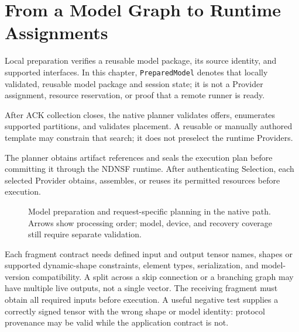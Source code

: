 \section{From a Model Graph to Runtime Assignments}
Local preparation verifies a reusable model package, its source identity, and supported interfaces. In this chapter, \texttt{PreparedModel} denotes that locally validated, reusable model package and session state; it is not a Provider assignment, resource reservation, or proof that a remote runner is ready.

After ACK collection closes, the native planner validates offers, enumerates supported partitions, and validates placement. A reusable or manually authored template may constrain that search; it does not preselect the runtime Providers.

The planner obtains artifact references and seals the execution plan before committing it through the NDNSF runtime. After authenticating Selection, each selected Provider obtains, assembles, or reuses its permitted resources before execution.

\begin{figure}[htbp]\singlespacing\centering
{}
\caption{Model preparation and request-specific planning in the native path. Arrows show processing order; model, device, and recovery coverage still require separate validation.}
\end{figure}

Each fragment contract needs defined input and output tensor names, shapes or supported dynamic-shape constraints, element types, serialization, and model-version compatibility. A split across a skip connection or a branching graph may have multiple live outputs, not a single vector. The receiving fragment must obtain all required inputs before execution. A useful negative test supplies a correctly signed tensor with the wrong shape or model identity: protocol provenance may be valid while the application contract is not.

